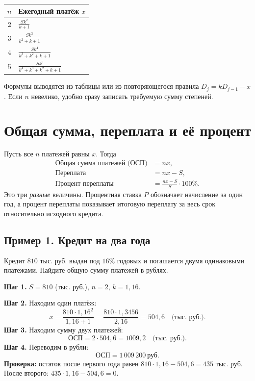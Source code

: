 \documentclass[a4paper,12pt]{article}
\begin{document}
\begin{tabularx}{\linewidth}{@{}cX@{}}
\toprule
\(n\) & Ежегодный платёж \(x\) \\
\midrule
2 & \(\displaystyle\frac{Sk^2}{k+1}\) \\[5pt]
3 & \(\displaystyle\frac{Sk^3}{k^2+k+1}\) \\[5pt]
4 & \(\displaystyle\frac{Sk^4}{k^3+k^2+k+1}\) \\[5pt]
5 & \(\displaystyle\frac{Sk^5}{k^4+k^3+k^2+k+1}\) \\
\bottomrule
\end{tabularx}

Формулы выводятся из таблицы или из повторяющегося правила \(D_j=kD_{j-1}-x\). Если \(n\) невелико, удобно сразу записать требуемую сумму степеней.

\clearpage
\section{Общая сумма, переплата и её процент}
Пусть все \(n\) платежей равны \(x\). Тогда
\begin{align*}
\text{Общая сумма платежей (ОСП)}&=nx,\\
\text{Переплата}&=nx-S,\\
\text{Процент переплаты}&=\frac{nx-S}{S}\cdot100\%.
\end{align*}
Это три \emph{разные} величины. Процентная ставка \(P\) обозначает начисление за один год, а процент переплаты показывает итоговую переплату за весь срок относительно исходного кредита.

\subsection{Пример 1. Кредит на два года}
Кредит \(810\) тыс. руб. выдан под \(16\%\) годовых и погашается двумя одинаковыми платежами. Найдите общую сумму платежей в рублях.

\textbf{Шаг 1.} \(S=810\) (тыс. руб.), \(n=2\), \(k=1{,}16\).

\textbf{Шаг 2.} Находим один платёж:
\[
 x=\frac{810\cdot 1{,}16^2}{1{,}16+1}
  =\frac{810\cdot 1{,}3456}{2{,}16}
  =504{,}6\quad\text{(тыс. руб.)}.
\]
\textbf{Шаг 3.} Находим сумму двух платежей:
\[
\text{ОСП}=2\cdot504{,}6=1009{,}2\quad\text{(тыс. руб.)}.
\]
\textbf{Шаг 4.} Переводим в рубли:
\[
\boxed{\text{ОСП}=1\,009\,200\ \text{руб.}}
\]
\textbf{Проверка:} остаток после первого года равен \(810\cdot1{,}16-504{,}6=435\) тыс. руб. После второго: \(435\cdot1{,}16-504{,}6=0\).
\end{document}
